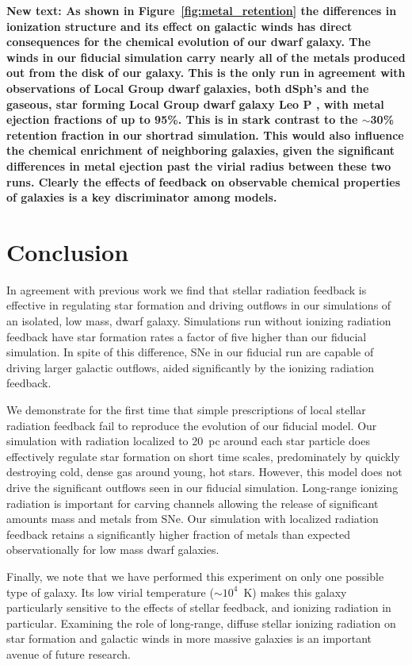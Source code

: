 \documentclass[twocolumn]{aastex62}
\begin{document}
\textbf{New text: As shown in Figure~\ref{fig:metal_retention} the differences in ionization structure and its effect on galactic winds has direct consequences for the chemical evolution of our dwarf galaxy. The winds in our fiducial simulation carry nearly all of the metals produced out from the disk of our galaxy. This is the only run in agreement with observations of Local Group dwarf galaxies, both dSph's \citep{Kirby2011} and the gaseous, star forming Local Group dwarf galaxy Leo P \citep{McQuinn2015}, with metal ejection fractions of up to 95\%. This is in stark contrast to the $\sim$30\% retention fraction in our shortrad simulation. This would also influence the chemical enrichment of neighboring galaxies, given the significant differences in metal ejection past the virial radius between these two runs. Clearly the effects of feedback on observable chemical properties of galaxies is a key discriminator among models.}

\section{Conclusion}  \label{sec:conclusion}
In agreement with previous work we find that stellar radiation feedback is effective in regulating star formation and driving outflows in our simulations of an isolated, low mass, dwarf galaxy. Simulations run without ionizing radiation feedback have star formation rates a factor of five higher than our fiducial simulation. In spite of this difference, SNe in our fiducial run are capable of driving larger galactic outflows, aided significantly by the ionizing radiation feedback.

We demonstrate for the first time that simple prescriptions of local stellar radiation feedback fail to reproduce the evolution of our fiducial model. Our simulation with radiation localized to 20~pc around each star particle does effectively regulate star formation on short time scales, predominately by quickly destroying cold, dense gas around young, hot stars. However, this model does not drive the significant outflows seen in our fiducial simulation. Long-range ionizing radiation is important for carving channels allowing the release of significant amounts mass and metals from SNe. Our simulation with localized radiation feedback retains a significantly higher fraction of metals than expected observationally for low mass dwarf galaxies.  

Finally, we note that we have performed this experiment on only one possible type of galaxy. Its low virial temperature ($\sim10^{4}$~K) makes this galaxy particularly sensitive to the effects of stellar feedback, and ionizing radiation in particular. Examining the role of long-range, diffuse stellar ionizing radiation on star formation and galactic winds in more massive galaxies is an important avenue of future research. 
\end{document}
